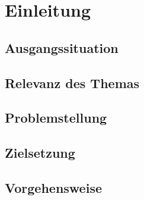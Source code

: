 
\chapter{Einleitung}
\section{Ausgangssituation}
\section{Relevanz des Themas}
\section{Problemstellung}
\section{Zielsetzung}
\section{Vorgehensweise}

